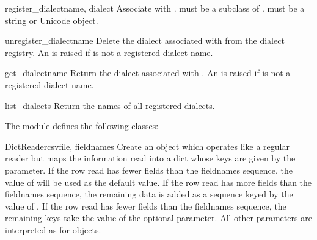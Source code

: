 \begin{funcdesc}{register_dialect}{name, dialect}
Associate  with .   must be a subclass
of .   must be a string or Unicode object.
\end{funcdesc}

\begin{funcdesc}{unregister_dialect}{name}
Delete the dialect associated with  from the dialect registry.  An
 is raised if  is not a registered dialect
name.
\end{funcdesc}

\begin{funcdesc}{get_dialect}{name}
Return the dialect associated with .  An  is
raised if  is not a registered dialect name.
\end{funcdesc}

\begin{funcdesc}{list_dialects}{}
Return the names of all registered dialects.
\end{funcdesc}


The  module defines the following classes:

\begin{classdesc}{DictReader}{csvfile, fieldnames}
Create an object which operates like a regular reader but maps the
information read into a dict whose keys are given by the 
parameter.  If the row read has fewer fields than the fieldnames sequence,
the value of  will be used as the default value.  If the row
read has more fields than the fieldnames sequence, the remaining data is
added as a sequence keyed by the value of .  If the row read
has fewer fields than the fieldnames sequence, the remaining keys take the
value of the optional  parameter.  All other parameters are
interpreted as for  objects.
\end{classdesc}


